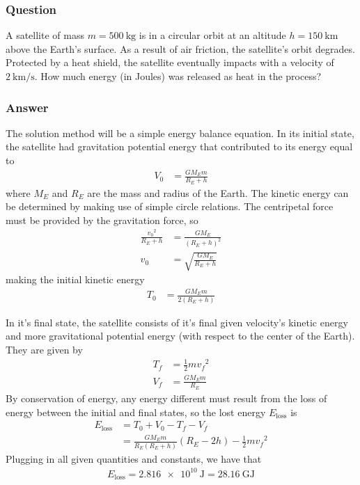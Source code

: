 \subsubsection{Question}

A satellite of mass $m = \SI{500}{\kg}$ is in a circular orbit at an
altitude $h = \SI{150}{\km}$ above the Earth's surface. As a result of air
friction, the satellite's orbit degrades. Protected by a heat shield, the
satellite eventually impacts with a velocity of $\SI{2}{\km\per\s}$. How
much energy (in Joules) was released as heat in the process?

\subsubsection{Answer}

The solution method will be a simple energy balance equation. In its initial
state, the satellite had gravitation potential energy that contributed to
its energy equal to
\begin{align*}
    V_0 &= \frac{GM_E m}{R_E + h}
\end{align*}
where $M_E$ and $R_E$ are the mass and radius of the Earth. The kinetic energy
can be determined by making use of simple circle relations. The centripetal
force must be provided by the gravitation force, so
\begin{align*}
    \frac{{v_0}^2}{R_E + h} &= \frac{GM_E}{(R_E + h)^2} \\
    v_0 &= \sqrt{\frac{GM_E}{R_E + h}}
\end{align*}
making the initial kinetic energy
\begin{align*}
    T_0 &= \frac{GM_E m}{2(R_E + h)}
\end{align*}

In it's final state, the satellite consists of it's final given velocity's
kinetic energy and more gravitational potential energy (with respect to the
center of the Earth). They are given by
\begin{align*}
    T_f &= \frac 12 m{v_f}^2 \\
    V_f &= \frac{GM_E m}{R_E}
\end{align*}
By conservation of energy, any energy different must result from the loss
of energy between the initial and final states, so the lost energy
$E_\mathrm{loss}$ is
\begin{align*}
    E_\mathrm{loss} &= T_0 + V_0 - T_f - V_f \\
    {} &= \frac{GM_E m}{R_E(R_E + h)}(R_E - 2h) - \frac 12 m{v_f}^2
\end{align*}
Plugging in all given quantities and constants, we have that
\begin{align}
    \boxed{
    E_\mathrm{loss} = \SI{2.816e10}{\J} = \SI{28.16}{\giga\J}
    }
\end{align}

